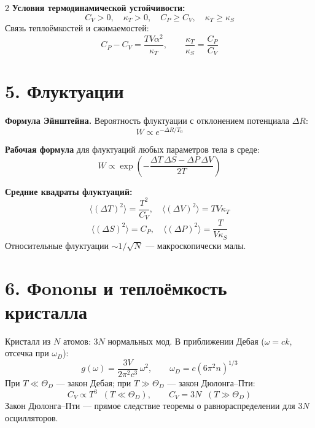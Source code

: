 \documentclass[a4paper,10pt]{article}
\begin{document}
\begin{multicols}{2}
\textbf{Условия термодинамической устойчивости:}
\begin{equation*}
    C_V > 0, \quad \kappa_T > 0, \quad C_P \geq C_V, \quad \kappa_T \geq \kappa_S
\end{equation*}
Связь теплоёмкостей и сжимаемостей:
\begin{equation*}
    C_P - C_V = \frac{TV\alpha^2}{\kappa_T}, \qquad \frac{\kappa_T}{\kappa_S} = \frac{C_P}{C_V}
\end{equation*}

\section*{5. Флуктуации}

\textbf{Формула Эйнштейна.} Вероятность флуктуации с отклонением потенциала $\Delta R$:
\begin{equation*}
    W \propto e^{-\Delta R/T_0}
\end{equation*}

\textbf{Рабочая формула} для флуктуаций любых параметров тела в среде:
\begin{equation*}
    W \propto \exp\!\left(-\frac{\Delta T\,\Delta S - \Delta P\,\Delta V}{2T}\right)
\end{equation*}

\textbf{Средние квадраты флуктуаций:}
\begin{equation*}
    \langle(\Delta T)^2\rangle = \frac{T^2}{C_V}, \quad
    \langle(\Delta V)^2\rangle = T V\kappa_T
\end{equation*}
\begin{equation*}
    \langle(\Delta S)^2\rangle = C_P, \quad
    \langle(\Delta P)^2\rangle = \frac{T}{V\kappa_S}
\end{equation*}
Относительные флуктуации $\sim 1/\sqrt{N}$ --- макроскопически малы.

\section*{6. Фononы и теплоёмкость кристалла}

Кристалл из $N$ атомов: $3N$ нормальных мод. В приближении Дебая ($\omega = ck$, отсечка при $\omega_D$):
\begin{equation*}
    g(\omega) = \frac{3V}{2\pi^2 c^3}\,\omega^2, \qquad
    \omega_D = c(6\pi^2 n)^{1/3}
\end{equation*}
При $T \ll \Theta_D$ --- закон Дебая; при $T \gg \Theta_D$ --- закон Дюлонга--Пти:
\begin{equation*}
    C_V \propto T^3 \;\;(T \ll \Theta_D), \qquad C_V = 3N \;\;(T \gg \Theta_D)
\end{equation*}
Закон Дюлонга--Пти --- прямое следствие теоремы о равнораспределении для $3N$ осцилляторов.


\end{multicols}
\end{document}
